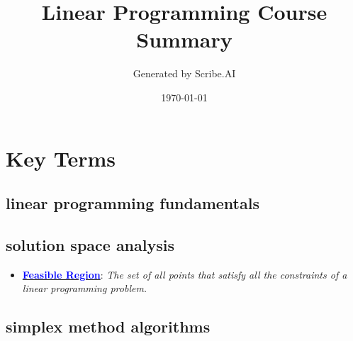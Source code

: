 \documentclass{article}%
\title{Linear Programming Course Summary}%
\author{Generated by Scribe.AI}%
\date{\today}%
\begin{document}
%
\normalsize%
\maketitle%
\section{Key Terms}%
\label{sec:KeyTerms}%
\begin{itemize}[leftmargin=*]%
\subsection{linear programming fundamentals}%
\label{subsec:linearprogrammingfundamentals}%
\begin{itemize}[leftmargin=*]%
%
\end{itemize}

%
\subsection{solution space analysis}%
\label{subsec:solutionspaceanalysis}%
\begin{itemize}[leftmargin=*]%
\item \href{https://www.math.purdue.edu/~yipn/421/2024-08-27-ExSimplex.pdf#page=4}{\textbf{\textcolor{blue}{Feasible Region}}}: \emph{The set of all points that satisfy all the constraints of a linear programming problem.}%
\end{itemize}

%
\subsection{simplex method algorithms}%
\label{subsec:simplexmethodalgorithms}%
\begin{itemize}[leftmargin=*]%
%
\end{itemize}

%
\end{itemize}%
\newpage

%
\end{document}
